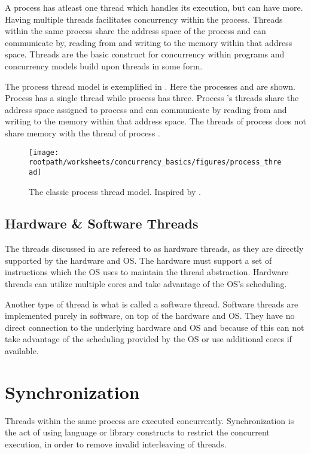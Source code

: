 A process has atleast one thread which handles its execution, but can have more. Having multiple threads facilitates concurrency within the process. Threads within the same process share the address space of the process and can communicate by, reading from and writing to the memory within that address space. Threads are the basic construct for concurrency within programs and concurrency models build upon threads in some form.

The process thread model is exemplified in . Here the processes  and  are shown. Process  has a single thread while process  has three. Process 's threads share the address space assigned to process  and can communicate by reading from and writing to the memory within that address space. The threads of process  does not share memory with the thread of process .

\begin{figure}[htbp]
\centering
 \texttt{[image: \\rootpath/worksheets/concurrency\_basics/figures/process\_thread]} 
 \caption{The classic process thread model. Inspired by \cite[p. 99]{tanenbaum2008modern}.}
\label{fig:classic_process_thread}
\end{figure}


\subsection{Hardware \& Software Threads}
The threads discussed in  are refereed to as hardware threads, as they are directly supported by the hardware and \ac{OS}. The hardware must support a set of instructions which the \ac{OS} uses to maintain the thread abstraction. Hardware threads can utilize multiple cores and take advantage of the \ac{OS}'s scheduling.

Another type of thread is what is called a software thread. Software threads are implemented purely in software, on top of the hardware and \ac{OS}. They have no direct connection to the underlying hardware and \ac{OS} and because of this can not take advantage of the scheduling provided by the \ac{OS} or use additional cores if available. 

\section{Synchronization}\label{sec:synchronization}
Threads within the same process are executed concurrently. Synchronization is the act of using language or library constructs to restrict the concurrent execution, in order to remove invalid interleaving of threads\cite[p. 1989]{scott2011sync}.

